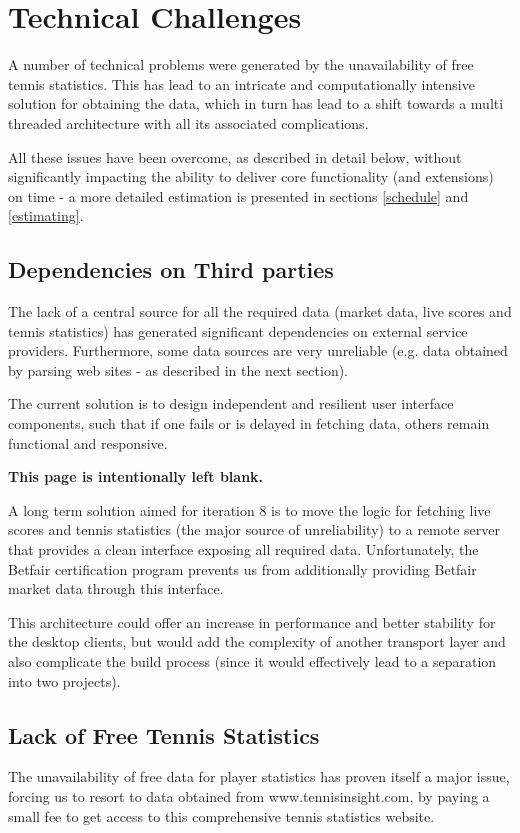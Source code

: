 \documentclass[10pt]{report}
\begin{document}
\section{Technical Challenges}

A number of technical problems were generated by the unavailability of free tennis statistics. This has lead to an intricate and computationally intensive solution for obtaining the data, which in turn has lead to a shift towards a multi threaded architecture with all its associated complications.

All these issues have been overcome, as described in detail below, without significantly impacting the ability to deliver core functionality (and extensions) on time - a more detailed estimation is presented in sections \ref{schedule} and  \ref{estimating}.

\subsection{Dependencies on Third parties}
The lack of a central source for all the required data (market data, live scores and tennis statistics) has generated significant dependencies on external service providers. Furthermore, some data sources are very unreliable (e.g. data obtained by parsing web sites - as described in the next section).

The current solution is to design independent and resilient user interface components, such that if one fails or is delayed in fetching data, others remain functional and responsive.

\pagebreak
{\bf This page is intentionally left blank.}
\pagebreak

A long term solution aimed for iteration 8 is to move the logic for fetching live scores and tennis statistics (the major source of unreliability) to a remote server that provides a clean interface exposing all required data. Unfortunately, the Betfair certification program prevents us from additionally providing Betfair market data through this interface.

This architecture could offer an increase in performance and better stability for the desktop clients, but would add the complexity of another transport layer and also complicate the build process (since it would effectively lead to a separation into two projects).

\subsection{Lack of Free Tennis Statistics}
The unavailability of free data for player statistics has proven itself a major issue, forcing us to resort to data obtained from www.tennisinsight.com, by paying a small fee to get access to this comprehensive tennis statistics website. 
\end{document}
